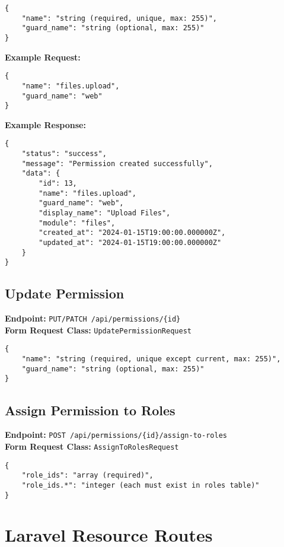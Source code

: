 \documentclass[12pt,a4paper]{article}
\begin{document}
\begin{lstlisting}[caption=Create Permission Request Body]
{
    "name": "string (required, unique, max: 255)",
    "guard_name": "string (optional, max: 255)"
}
\end{lstlisting}

\textbf{Example Request:}
\begin{lstlisting}[caption=Create Permission Example Request]
{
    "name": "files.upload",
    "guard_name": "web"
}
\end{lstlisting}

\textbf{Example Response:}
\begin{lstlisting}[caption=Create Permission Example Response]
{
    "status": "success",
    "message": "Permission created successfully",
    "data": {
        "id": 13,
        "name": "files.upload",
        "guard_name": "web",
        "display_name": "Upload Files",
        "module": "files",
        "created_at": "2024-01-15T19:00:00.000000Z",
        "updated_at": "2024-01-15T19:00:00.000000Z"
    }
}
\end{lstlisting}

\subsection{Update Permission}
\textbf{Endpoint:} \texttt{PUT/PATCH /api/permissions/\{id\}}\\
\textbf{Form Request Class:} \texttt{UpdatePermissionRequest}

\begin{lstlisting}[caption=Update Permission Request Body]
{
    "name": "string (required, unique except current, max: 255)",
    "guard_name": "string (optional, max: 255)"
}
\end{lstlisting}

\subsection{Assign Permission to Roles}
\textbf{Endpoint:} \texttt{POST /api/permissions/\{id\}/assign-to-roles}\\
\textbf{Form Request Class:} \texttt{AssignToRolesRequest}

\begin{lstlisting}[caption=Assign to Roles Request Body]
{
    "role_ids": "array (required)",
    "role_ids.*": "integer (each must exist in roles table)"
}
\end{lstlisting}

\section{Laravel Resource Routes}
\end{document}
